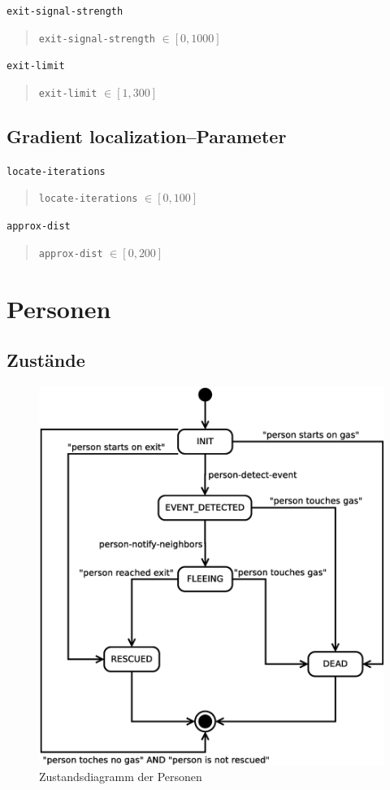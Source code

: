 \verb|exit-signal-strength|

\begin{quote}
\verb|exit-signal-strength| $\in [0, 1000]$
\end{quote}

\verb|exit-limit|

\begin{quote}
\verb|exit-limit| $\in [1, 300]$
\end{quote}

\subsection{Gradient localization--Parameter}
\label{sec:gui_localization}

\verb|locate-iterations|

\begin{quote}
\verb|locate-iterations| $\in [0, 100]$
\end{quote}

\verb|approx-dist|

\begin{quote}
\verb|approx-dist| $\in [0, 200]$
\end{quote}






\section{Personen}
\label{sec:personen}

\subsection{Zustände}


\begin{figure}
\centering
\includegraphics[height=0.6\textwidth]{simulationsumgebung/person.eps}
\caption{Zustandsdiagramm der Personen}
\label{fig:person}
\end{figure}

